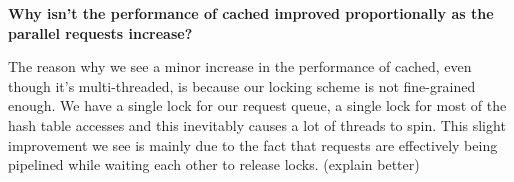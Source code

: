 \textbf{Why isn't the performance of cached improved proportionally as the 
	parallel requests increase?}

The reason why we see a minor increase in the performance of cached, even 
though it's multi-threaded, is because our locking scheme is not fine-grained 
enough. We have a single lock for our request queue, a single lock for most of 
the hash table accesses and this inevitably causes a lot of threads to spin.  
This slight improvement we see is mainly due to the fact that requests are 
effectively being pipelined while waiting each other to release locks. (explain 
better)



